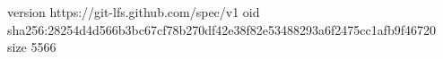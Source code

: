 version https://git-lfs.github.com/spec/v1
oid sha256:28254d4d566b3bc67cf78b270df42e38f82e53488293a6f2475cc1afb9f46720
size 5566
